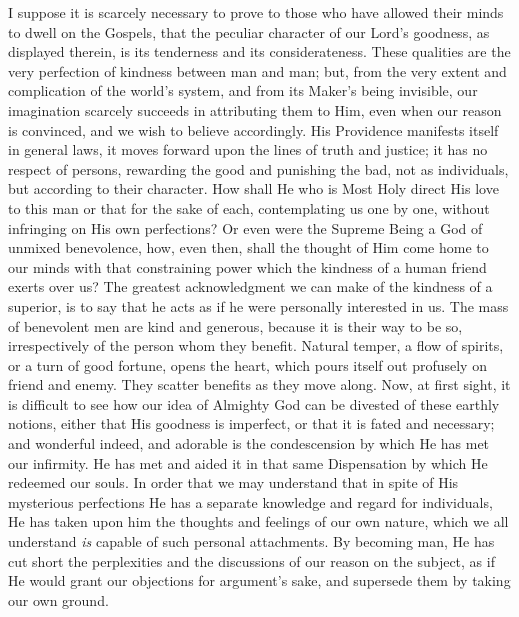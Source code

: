 I suppose it is scarcely necessary to prove to those who have
allowed their minds to dwell on the Gospels, that the peculiar
character of our Lord's goodness, as displayed therein, is its
tenderness and its considerateness. These qualities are the very
perfection of kindness between man and man; but, from the very extent
and complication of the world's system, and from its Maker's being
invisible, our imagination scarcely succeeds in attributing them to
Him, even when our reason is convinced, and we wish to believe
accordingly. His Providence manifests itself in general laws, it moves
forward upon the lines of truth and justice; it has no respect of
persons, rewarding the good and punishing the bad, not as individuals,
but according to their character. How shall He who is Most Holy direct
His love to this man or that for the sake of each, contemplating us
one by one, without infringing on His own perfections? Or even were
the Supreme Being a God of unmixed benevolence, how, even then, shall
the thought of Him come home to our minds with that constraining power
which the kindness of a human friend exerts over us? The greatest
acknowledgment we can make of the kindness of a superior, is to say
that he acts as if he were personally interested in us. The mass of
benevolent men are kind and generous, because it is their way to be
so, irrespectively of the person whom they benefit. Natural temper, a
flow of spirits, or a turn of good fortune, opens the heart, which
pours itself out profusely on friend and enemy. They scatter benefits
as they move along. Now, at first sight, it is difficult to see how
our idea of Almighty God can be divested of these earthly notions,
either that His goodness is imperfect, or that it is fated and
necessary; and wonderful indeed, and adorable is the condescension by
which He has met our infirmity. He has met and aided it in that same
Dispensation by which He redeemed our souls. In order that we may
understand that in spite of His mysterious perfections He has a
separate knowledge and regard for individuals, He has taken upon him
the thoughts and feelings of our own nature, which we all understand \emph{is}
capable of such personal attachments. By becoming man, He has cut
short the perplexities and the discussions of our reason on the
subject, as if He would grant our objections for argument's sake, and
supersede them by taking our own ground.

